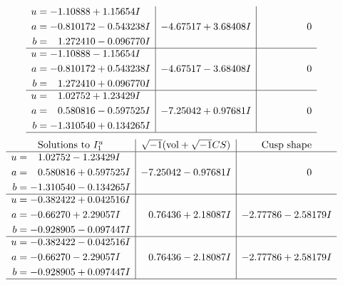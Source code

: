 \documentclass[1p]{elsarticle_modified}
\theoremstyle{definition}
\newcommand{\I}{\sqrt{-1}}
\begin{document}
$$\begin{array}{c|c|c}
\begin{aligned}
u &= -1.10888 + 1.15654 I \\
a &= -0.810172 - 0.543238 I \\
b &= \phantom{-}1.272410 - 0.096770 I\end{aligned}
 & -4.67517 + 3.68408 I & \phantom{-0.000000 } 0 \\ \hline\begin{aligned}
u &= -1.10888 - 1.15654 I \\
a &= -0.810172 + 0.543238 I \\
b &= \phantom{-}1.272410 + 0.096770 I\end{aligned}
 & -4.67517 - 3.68408 I & \phantom{-0.000000 } 0 \\ \hline\begin{aligned}
u &= \phantom{-}1.02752 + 1.23429 I \\
a &= \phantom{-}0.580816 - 0.597525 I \\
b &= -1.310540 + 0.134265 I\end{aligned}
 & -7.25042 + 0.97681 I & \phantom{-0.000000 } 0\\
 \hline 
 \end{array}$$\newpage$$\begin{array}{c|c|c}  
\text{Solutions to }I^u_{1}& \I (\text{vol} + \sqrt{-1}CS) & \text{Cusp shape}\\
 \hline 
\begin{aligned}
u &= \phantom{-}1.02752 - 1.23429 I \\
a &= \phantom{-}0.580816 + 0.597525 I \\
b &= -1.310540 - 0.134265 I\end{aligned}
 & -7.25042 - 0.97681 I & \phantom{-0.000000 } 0 \\ \hline\begin{aligned}
u &= -0.382422 + 0.042516 I \\
a &= -0.66270 + 2.29057 I \\
b &= -0.928905 - 0.097447 I\end{aligned}
 & \phantom{-}0.76436 + 2.18087 I & -2.77786 - 2.58179 I \\ \hline\begin{aligned}
u &= -0.382422 - 0.042516 I \\
a &= -0.66270 - 2.29057 I \\
b &= -0.928905 + 0.097447 I\end{aligned}
 & \phantom{-}0.76436 - 2.18087 I & -2.77786 + 2.58179 I\\
 \hline 
 \end{array}$$\newpage\newpage\renewcommand{\arraystretch}{1}
\end{document}
